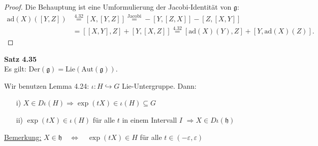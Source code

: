 \documentclass[fleqn, 12pt, letterpaper]{article}
\begin{document}
\begin{proof}
    Die Behauptung ist eine Umformulierung der Jacobi-Identität von $\mathfrak{g}$:
\begin{align*}
\mathrm{ad}(X)([Y, Z]) &\overset{4.32}{=} [X, [Y, Z]] \overset{\text{Jacobi}}{=} -[Y, [Z, X]] - [Z, [X, Y]] \\
&= [ [X, Y], Z ] + [Y, [X, Z]] \overset{4.32}{=} [\mathrm{ad}(X)(Y), Z] + [Y, \mathrm{ad}(X)(Z)].
\end{align*}
\end{proof}

\textbf{Satz 4.35}\\
Es gilt:
\(
\mathrm{Der}(\mathfrak{g}) = \mathrm{Lie}(\mathrm{Aut}(\mathfrak{g})).
\)

Wir benutzen Lemma 4.24: $\iota \colon H \hookrightarrow G$ Lie-Untergruppe. Dann:
\begin{itemize}
    \item[i)] $X \in D{\iota}(H) \Rightarrow \exp(tX) \in \iota(H) \subseteq G$
    \item[ii)] $\exp(tX) \in \iota(H)$ für alle $t$ in einem Intervall $I$ $\Rightarrow X \in D{\iota}(\mathfrak{h})$
\end{itemize}

\underline{Bemerkung:} 
$X \in \mathfrak{h} \quad \Leftrightarrow \quad \exp(tX) \in H$ für alle $t \in (-\varepsilon, \varepsilon)$
\end{document}
